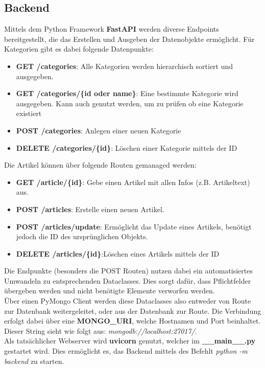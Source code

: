 \subsection{Backend}
Mittels dem Python Framework \textbf{FastAPI} werden diverse Endpoints bereitgestellt, die das Erstellen und Ausgeben der Datenobjekte ermöglicht.
Für Kategorien gibt es dabei folgende Datenpunkte:
\begin{itemize}
\item \textbf{GET /categories}: Alle Kategorien werden hierarchisch sortiert und ausgegeben.
\item \textbf{GET /categories/\{id oder name\}}: Eine bestimmte Kategorie wird ausgegeben. Kann auch genutzt werden, um zu prüfen ob eine Kategorie existiert 
\item \textbf{POST /categories}: Anlegen einer neuen Kategorie
\item \textbf{DELETE /categories/\{id\}}: Löschen einer Kategorie mittels der ID
\end{itemize}


Die Artikel können über folgende Routen gemanaged werden:
\begin{itemize}
\item \textbf{GET /article/\{id\}}: Gebe einen Artikel mit allen Infos (z.B. Artikeltext) aus.
\item \textbf{POST /articles}: Erstelle einen neuen Artikel.
\item \textbf{POST /articles/update}: Ermöglicht das Update eines Artikels, benötigt jedoch die ID des ursprünglichen Objekts.
\item \textbf{DELETE /articles/\{id\}}:Löschen eines Artikels mittels der ID
\end{itemize}

Die Endpunkte (besonders die POST Routen) nutzen dabei ein automatisiertes Umwandeln zu entsprechenden Dataclasses.
Dies sorgt dafür, dass Pflichtfelder übergeben werden und nicht benötigte Elemente verworfen werden.\\
Über einen PyMongo Client werden diese Dataclasses also entweder von Route zur Datenbank weitergeleitet, oder aus der Datenbank zur Route.
Die Verbindung erfolgt dabei über eine \textbf{MONGO\_URI}, welche Hostnamen und Port beinhaltet. Dieser String sieht wie folgt aus: \textit{mongodb://localhost:27017/}. \\
Als tatsächlicher Webserver wird \textbf{uvicorn} genutzt, welcher im \textbf{\_\_main\_\_.py} gestartet wird. Dies ermöglicht es, das Backend mittels des Befehlt \textit{python -m backend} zu starten.

